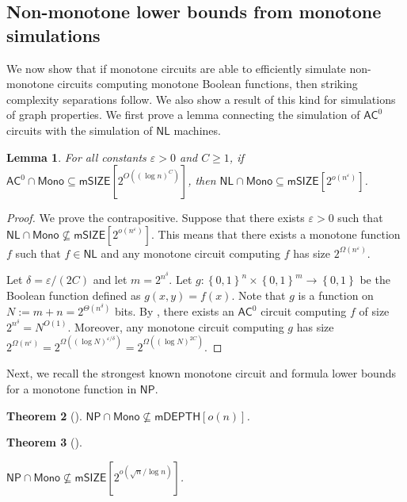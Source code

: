 \documentclass[10pt,a4paper]{article}
\newtheorem{theorem}{Theorem}[section]
\newtheorem{lemma}[theorem]{Lemma}
\newcommand{\eps}{\varepsilon}
\newcommand{\complexityfont}[1]{\mathsf{#1}}
\newcommand{\monclass}[1]{\mathsf{m}#1}
\newcommand\NL           {\complexityfont{NL}}
\def\NP           {\complexityfont{NP}}
\def\AC           {\complexityfont{AC}}
\def\SIZE         {\complexityfont{SIZE}}
\def\DEPTH        {\complexityfont{DEPTH}}
\def\mSIZE        {\monclass{\SIZE}}
\def\mDEPTH       {\monclass{\DEPTH}}
\newcommand{\semMon}[1]{#1 \cap \monfns}
\newcommand{\monfns}{\mathsf{Mono}}
\def\sseq{\subseteq}
\newcommand{\set}[1]{\left\{#1\right\}}
\newcommand{\blt}{\set{0,1}}
\begin{document}
\subsection{Non-monotone lower bounds
from monotone simulations}


We now show that if monotone circuits are able to
efficiently simulate non-monotone circuits computing monotone Boolean
functions,
then striking complexity separations follow.
We also show a result of this kind for simulations of graph properties.
We first prove a lemma connecting the simulation of $\AC^0$ circuits
with the simulation of $\NL$ machines.

\begin{lemma}
    \label{thm:nc1-ac0-size}
    For all constants $\eps > 0$ and $C \geq 1$, 
    if 
    $\semMon{\AC^0} 
    \sseq \mSIZE[2^{O((\log n)^C)}]$, 
    then
    $\semMon{\NL} \sseq \mSIZE[2^{o(n^\eps)}]$.
\end{lemma}
\begin{proof}
    We prove the contrapositive.
    Suppose that there exists $\eps > 0$
    such that
    $\semMon{\NL} \not\sseq \mSIZE[2^{o(n^\eps)}]$.
    This means that there exists a monotone function $f$
    such that 
    $f \in \NL$
    and any monotone circuit computing $f$ has size $2^{\Omega(n^\eps)}$.

    Let $\delta = \eps/(2C)$ and let $m = 2^{n^{\delta}}$.
    Let $g : \blt^{n} \times \blt^{m} \to \blt$
    be the Boolean function defined as
    $g(x,y) = f(x)$.
    Note that $g$ is a function on $N := m + n = 2^{\Theta(n^{\delta})}$
    bits.
    By ,
    there exists an $\AC^0$ circuit computing
    $f$ of size 
    $2^{n^\delta} = N^{O(1)}$.
    Moreover, any monotone circuit computing $g$
    has size
    $2^{\Omega(n^\eps)} = 2^{\Omega((\log N)^{\eps / \delta})} =
    2^{\Omega((\log N)^{2C})}$.
\end{proof}




Next, we recall the strongest known monotone circuit 
and formula
lower 
bounds
for a
monotone function in $\NP$. 

\begin{theorem}[\cite{DBLP:conf/stoc/PitassiR17}]
    \label{thm:pr17-fnp}
     $\semMon{\NP} \not\sseq \mDEPTH[o(n)]$.
\end{theorem}

\begin{theorem}[\cite{CKR20}]
    \label{thm:ckr20}
     
    $\semMon{\NP} \not\sseq \mSIZE[2^{o(\sqrt{n}/\log n)}]$.
\end{theorem}
\end{document}
